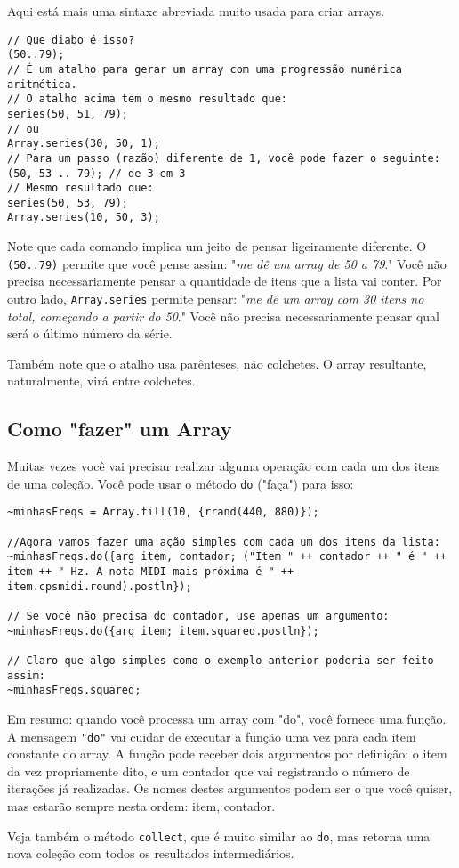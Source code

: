 Aqui está mais uma sintaxe abreviada muito usada para criar arrays.

 
\begin{lstlisting}[style=SuperCollider-IDE, basicstyle=\scttfamily\footnotesize]
// Que diabo é isso?
(50..79);
// É um atalho para gerar um array com uma progressão numérica aritmética.
// O atalho acima tem o mesmo resultado que:
series(50, 51, 79);
// ou
Array.series(30, 50, 1);
// Para um passo (razão) diferente de 1, você pode fazer o seguinte:
(50, 53 .. 79); // de 3 em 3
// Mesmo resultado que:
series(50, 53, 79);
Array.series(10, 50, 3);
\end{lstlisting}

Note que cada comando implica um jeito de pensar ligeiramente diferente. O \texttt{(50..79)} permite que você pense assim: "\emph{me dê um array de 50 a 79}." Você não precisa necessariamente pensar a quantidade de itens que a lista vai conter. Por outro lado, \texttt{Array.series} permite pensar: "\emph{me dê um array com 30 itens no total, começando a partir do 50}." Você não precisa necessariamente pensar qual será o último número da série.

Também note que o atalho usa parênteses, não colchetes. O array resultante, naturalmente, virá entre colchetes.
\subsection{Como "fazer" um Array}

Muitas vezes você vai precisar realizar alguma operação com cada um dos itens de uma coleção. Você pode usar o método \texttt{do} ("faça") para isso:


\begin{lstlisting}[style=SuperCollider-IDE, basicstyle=\scttfamily\footnotesize]
~minhasFreqs = Array.fill(10, {rrand(440, 880)});

//Agora vamos fazer uma ação simples com cada um dos itens da lista:
~minhasFreqs.do({arg item, contador; ("Item " ++ contador ++ " é " ++ item ++ " Hz. A nota MIDI mais próxima é " ++ item.cpsmidi.round).postln});

// Se você não precisa do contador, use apenas um argumento:
~minhasFreqs.do({arg item; item.squared.postln});

// Claro que algo simples como o exemplo anterior poderia ser feito assim:
~minhasFreqs.squared;
\end{lstlisting}
 

Em resumo: quando você processa um array com "do", você fornece uma função. A mensagem \texttt{"do"} vai cuidar de executar a função uma vez para cada item constante do array. A função pode receber dois argumentos por definição: o item da vez propriamente dito, e um contador que vai registrando o número de iterações já realizadas. Os nomes destes argumentos podem ser o que você quiser, mas estarão sempre nesta ordem: item, contador.

Veja também o método \texttt{collect}, que é muito similar ao \texttt{do}, mas retorna uma nova coleção com todos os resultados intermediários.
